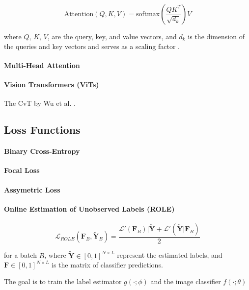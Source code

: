 \documentclass[lettersize,journal]{IEEEtran}
\begin{document}
\begin{equation}
    \text{Attention}(Q,K,V) = \text{softmax}\left(\frac{QK^T}{\sqrt{d_k}}\right)V
\end{equation}

\noindent where $Q$, $K$, $V$, are the query, key, and value vectors, and $d_k$ is the dimension of the queries and key vectors and serves as a scaling factor \cite{vaswani2023attentionneed}. 



\paragraph{Multi-Head Attention}
\paragraph{Vision Transformers (ViTs)}
The CvT by Wu et al. \cite{CvT}.

\subsection{Loss Functions}
\paragraph{Binary Cross-Entropy}
\paragraph{Focal Loss}
\paragraph{Assymetric Loss}

\paragraph{Online Estimation of Unobserved Labels (ROLE)}

\begin{equation}
    \mathcal{L}_{ROLE}(\bm{F}_B, \bm{\tilde{Y}}_B) = \frac{\mathcal{L}'(\bm{F}_B)|\bm{\tilde{Y}}+\mathcal{L}'(\bm{\tilde{Y}}|\bm{F}_B)}{2}
\end{equation}

for a batch $B$, where $\bm{\tilde{Y}}\in[0,1]^{N\times L}$ represent the estimated labels, and $\bm{F}\in[0,1]^{N\times L}$ is the matrix of classifier predictions.

The goal is to train the label estimator $g(\cdot;\phi)$ and the image classifier $f(\cdot;\theta)$
\end{document}
